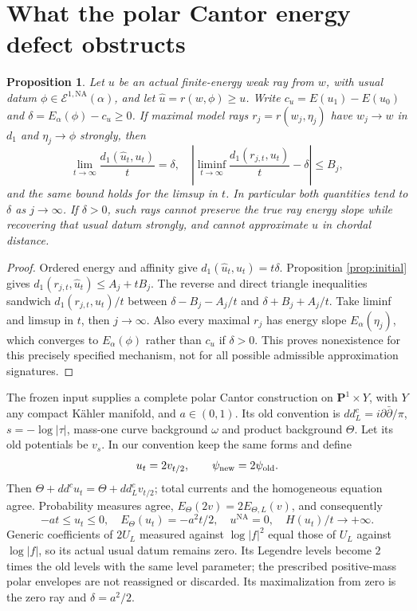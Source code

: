 \documentclass[11pt]{article}
\newcommand{\NA}{\mathrm{NA}}
\newcommand{\cE}{\mathcal E}
\newcommand{\ddc}{dd^c}
\newtheorem{proposition}[theorem]{Proposition}
\theoremstyle{remark}\newtheorem{remark}[theorem]{Remark}
\begin{document}
\section{What the polar Cantor energy defect obstructs}
\begin{proposition}\label{prop:defect}
Let $u$ be an actual finite-energy weak ray from $w$, with usual
datum $\phi\in\cE^{1,\NA}(\alpha)$, and let
$\widehat u=r(w,\phi)\geq u$. Write
$c_u=E(u_1)-E(u_0)$ and
$\delta=E_\alpha(\phi)-c_u\geq0$.
If maximal model rays $r_j=r(w_j,\eta_j)$ have
$w_j\to w$ in $d_1$ and $\eta_j\to\phi$ strongly, then
\[
 \lim_{t\to\infty}\frac{d_1(\widehat u_t,u_t)}t=\delta,
 \quad
 \left|\liminf_{t\to\infty}\frac{d_1(r_{j,t},u_t)}t-\delta\right|\leq B_j,
\]
and the same bound holds for the limsup in $t$.
In particular both quantities tend to $\delta$ as $j\to\infty$.
If $\delta>0$, such rays cannot preserve the true ray energy slope
while recovering that usual datum strongly, and cannot approximate
$u$ in chordal distance.
\end{proposition}
\begin{proof}
Ordered energy and affinity give
$d_1(\widehat u_t,u_t)=t\delta$. Proposition \ref{prop:initial}
gives $d_1(r_{j,t},\widehat u_t)\leq A_j+tB_j$.
The reverse and direct triangle inequalities sandwich
$d_1(r_{j,t},u_t)/t$ between
$\delta-B_j-A_j/t$ and $\delta+B_j+A_j/t$.
Take liminf and limsup in $t$, then $j\to\infty$.
Also every maximal $r_j$ has energy slope $E_\alpha(\eta_j)$,
which converges to $E_\alpha(\phi)$ rather than $c_u$ if
$\delta>0$. This proves nonexistence for this precisely specified
mechanism, not for all possible admissible approximation signatures.
\end{proof}

The frozen input supplies a complete polar Cantor construction on
$\mathbf P^1\times Y$, with $Y$ any compact K\"ahler manifold, and
$a\in(0,1)$. Its old convention is
$\ddc_L=i\partial\bar\partial/\pi$, $s=-\log|\tau|$,
mass-one curve background $\omega$ and product background $\Theta$.
Let its old potentials be $v_s$. In our convention keep the same
forms and define
\[
 u_t=2v_{t/2},\qquad \psi_{\rm new}=2\psi_{\rm old}.
\]
Then $\Theta+\ddc u_t=\Theta+\ddc_Lv_{t/2}$; total currents
and the homogeneous equation agree. Probability measures agree,
$E_\Theta(2v)=2E_{\Theta,L}(v)$, and consequently
\[
 -at\leq u_t\leq0,\quad E_\Theta(u_t)=-a^2t/2,\quad
 u^{\NA}=0,\quad H(u_t)/t\to+\infty.
\]
Generic coefficients of $2U_L$ measured against $\log|f|^2$ equal
those of $U_L$ against $\log|f|$, so its actual usual datum remains
zero. Its Legendre levels become $2$ times the old levels with the
same level parameter; the prescribed positive-mass polar envelopes
are not reassigned or discarded. Its maximalization from zero is
the zero ray and $\delta=a^2/2$.
\end{document}
